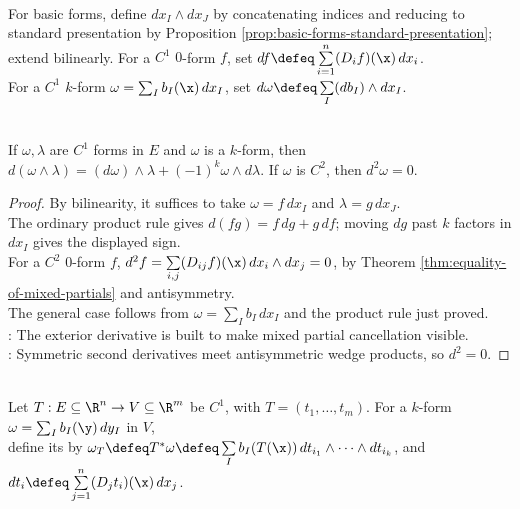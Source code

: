 \begin{definition} \label{def:wedge-product-and-exterior-derivative} \\
For basic forms, define $dx_I\wedge dx_J$ by concatenating indices and reducing to standard presentation by Proposition \ref{prop:basic-forms-standard-presentation}; extend bilinearly. For a $C^1$ $0$-form $f$, set $df\defeq\sum\limits_{i=1}^{n}(D_if)(\x)\,dx_i$.\\
For a $C^1$ $k$-form $\omega=\sum_I b_I(\x)\,dx_I$, set $d\omega\defeq\sum\limits_I (db_I)\wedge dx_I$.
\end{definition}

\begin{theorem} \label{thm:exterior-derivative-basic-laws} \\
If $\omega,\lambda$ are $C^1$ forms in $E$ and $\omega$ is a $k$-form, then $d(\omega\wedge\lambda)=(d\omega)\wedge\lambda+(-1)^k\omega\wedge d\lambda$. If $\omega$ is $C^2$, then $d^2\omega=0$.
\begin{proof}
By bilinearity, it suffices to take $\omega=f\,dx_I$ and $\lambda=g\,dx_J$.\\
The ordinary product rule gives $d(fg)=f\,dg+g\,df$; moving $dg$ past $k$ factors in $dx_I$ gives the displayed sign.\\
For a $C^2$ $0$-form $f$, $d^2f=\sum\limits_{i,j}(D_{ij}f)(\x)\,dx_i\wedge dx_j=0$, by Theorem \ref{thm:equality-of-mixed-partials} and antisymmetry.\\
The general case follows from $\omega=\sum_I b_I\,dx_I$ and the product rule just proved.\\
: The exterior derivative is built to make mixed partial cancellation visible.\\
: Symmetric second derivatives meet antisymmetric wedge products, so $d^2=0$.
\end{proof}
\end{theorem}

\begin{definition} \label{def:pullback-of-differential-form} \\
Let $T:E\subseteq\R^n\to V\subseteq\R^m$ be $C^1$, with $T=(t_1,\ldots,t_m)$. For a $k$-form $\omega=\sum_I b_I(\y)\,dy_I$ in $V$,\\
define its  by $\omega_T\defeq T^\ast\omega\defeq \sum\limits_I b_I(T(\x))\,dt_{i_1}\wedge\cdots\wedge dt_{i_k}$, and $dt_i\defeq\sum\limits_{j=1}^{n}(D_jt_i)(\x)\,dx_j$.
\end{definition}

